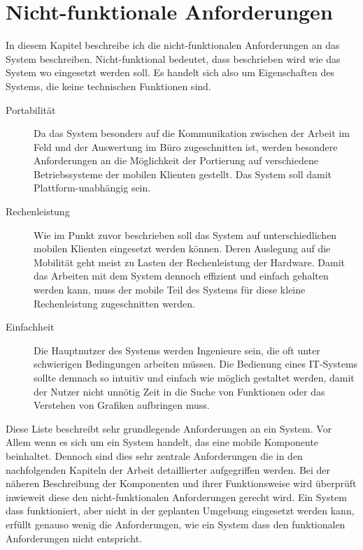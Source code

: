 \section{Nicht-funktionale Anforderungen}
In diesem Kapitel beschreibe ich die nicht-funktionalen Anforderungen an das System beschreiben. Nicht-funktional bedeutet, dass beschrieben wird wie das System wo eingesetzt werden soll. Es handelt sich also um Eigenschaften des Systems, die keine technischen Funktionen sind.

\begin{description}
\item[Portabilität] Da das System besonders auf die Kommunikation zwischen der Arbeit im Feld und der Auswertung im Büro zugeschnitten ist, werden besondere Anforderungen an die Möglichkeit der Portierung auf verschiedene Betriebssysteme der mobilen Klienten gestellt. Das System soll damit Plattform-unabhängig sein. 
\item[Rechenleistung] Wie im Punkt zuvor beschrieben soll das System auf unterschiedlichen mobilen Klienten eingesetzt werden können. Deren Auslegung auf die Mobilität geht meist zu Lasten der Rechenleistung der Hardware. Damit das Arbeiten mit dem System dennoch effizient und einfach gehalten werden kann, muss der mobile Teil des Systems für diese kleine Rechenleistung zugeschnitten werden.
\item[Einfachheit] Die Hauptnutzer des Systems werden Ingenieure sein, die oft unter schwierigen Bedingungen arbeiten müssen. Die Bedienung eines IT-Systems sollte demnach so intuitiv und einfach wie möglich gestaltet werden, damit der Nutzer nicht unnötig Zeit in die Suche von Funktionen oder das Verstehen von Grafiken aufbringen muss.
\end{description}

Diese Liste beschreibt sehr grundlegende Anforderungen an ein System. Vor Allem wenn es sich um ein System handelt, das eine mobile Komponente beinhaltet. Dennoch sind dies sehr zentrale Anforderungen die in den nachfolgenden Kapiteln der Arbeit detaillierter aufgegriffen werden. Bei der näheren Beschreibung der Komponenten und ihrer Funktionsweise wird überprüft inwieweit diese den nicht-funktionalen Anforderungen gerecht wird. Ein System dass funktioniert, aber nicht in der geplanten Umgebung eingesetzt werden kann, erfüllt genauso wenig die Anforderungen, wie ein System dass den funktionalen Anforderungen nicht entspricht.


